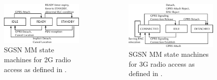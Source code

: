 \documentclass{beamer}
\begin{document}
\begin{frame}
	\begin{columns}[T]
		\begin{figure}
			\includegraphics[width=\columnwidth]{../../chapters/04-mobilenets/images/mm-2g-state-model.pdf}
			\caption{SGSN MM state machines for 2G radio access as defined in \cite[Section~6.1]{3gpp.23.060}.}
		\end{figure}

		\begin{figure}
			\includegraphics[width=\columnwidth]{../../chapters/04-mobilenets/images/mm-3g-state-model.pdf}
			\caption{SGSN MM state machines for 3G radio access as defined in \cite[Section~6.1]{3gpp.23.060}.}
		\end{figure}
	\end{columns}
\end{frame}
\end{document}
